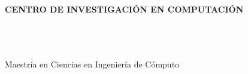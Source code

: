 \makeatletter
\begin{titlepage}
\begin{center}

\uppercase{\textbf{\large{Centro de Investigación en Computación}}}
\\[6cm]

\uppercase{\textbf{\fypcode \\[0.3cm]\@title}}
\\[4cm]

\@author
\\[2cm]

\end{center}
\vfill
Maestría en Ciencias en Ingeniería de Cómputo\\
\@date
\end{titlepage}
\makeatother